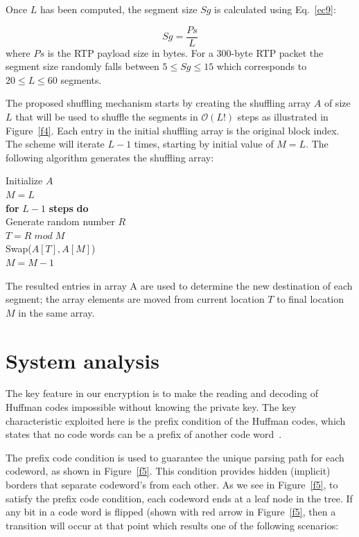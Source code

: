 \documentclass[preprint]{elsarticle}
\begin{document}
Once $L$ has been computed, the segment size $Sg$ is calculated using Eq.~\ref{ec9}:

\begin{equation}
Sg = \frac{Ps}{L}
\label{ec9}
\end{equation}
where $Ps$ is the RTP payload size in bytes. For a 300-byte RTP packet the segment size randomly falls between $5\leq Sg \leq 15$ which corresponds to $20 \leq L \leq 60$ segments.

The proposed shuffling mechanism starts by creating the shuffling array $A$ of size $L$ that will be used to shuffle the segments in $\mathcal{O}(L!)$ steps as illustrated in Figure~\ref{f4}. Each entry in the initial shuffling array is the original block index. The scheme will iterate $L-1$ times, starting by initial value of $M = L$. The following algorithm generates the shuffling array:


\noindent \hspace*{30mm} Initialize $A$ \\
\hspace*{30mm} $M=L$   \\
\hspace*{30mm} \textbf{for} $L-1$ \textbf{steps} \textbf{do} \\
\hspace*{35mm} Generate random number $R$ \\
\hspace*{35mm} $T = R\; mod \; M$ \\ 
\hspace*{35mm} Swap($A[T], A[M]$) \\
\hspace*{35mm} $M=M-1$ 


The resulted entries in array A are used to determine the new destination of each segment; the array elements are moved from current location $T$ to final location $M$ in the same array.


\section{System analysis}
\label{SystemAnalisis}

The key feature in our encryption is to make the reading and decoding of Huffman codes impossible without knowing the private key. The key characteristic exploited here is the prefix condition of the Huffman codes, which states that no code words can be a prefix of another code word~\cite{Huffman1952}.

The prefix code condition is used to guarantee the unique parsing path for each codeword, as shown in Figure~\ref{f5}. This condition provides hidden (implicit) borders that separate codeword's from each other. As we see in Figure~\ref{f5}, to satisfy the prefix code condition, each codeword ends at a leaf node in the tree. If any bit in a code word is flipped (shown with red arrow in Figure~\ref{f5}, then a transition will occur at that point which results one of the following scenarios:
\end{document}
